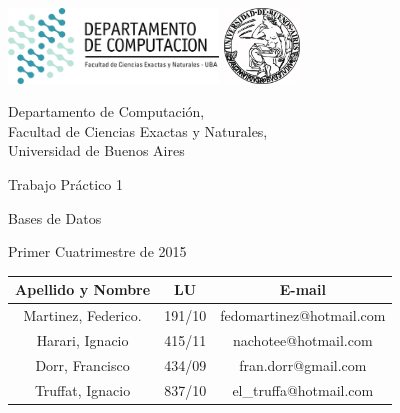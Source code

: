 \documentclass[a4paper, 10pt, twoside]{article}
\newcommand{\titulo}{Trabajo Práctico 1}
\newcommand{\materia}{Bases de Datos}
\newcommand{\cuatrimestre}{Primer Cuatrimestre de 2015}
\begin{document}


\thispagestyle{caratula}

\begin{center}

\includegraphics[height=2cm]{DC.png} 
\hfill
\includegraphics[height=2cm]{UBA.jpg} 

\vspace{2cm}

Departamento de Computación,\\
Facultad de Ciencias Exactas y Naturales,\\
Universidad de Buenos Aires

\vspace{4cm}

\begin{Huge}
\titulo
\end{Huge}

\vspace{0.5cm}

\begin{Large}
\materia
\end{Large}

\vspace{1cm}

\cuatrimestre

\vspace{4cm}

\begin{tabular}{|c|c|c|}
\hline
Apellido y Nombre & LU & E-mail\\
\hline
Martinez, Federico.  & 191/10 &  fedomartinez@hotmail.com\\
Harari, Ignacio      & 415/11 & nachotee@hotmail.com\\
Dorr, Francisco & 434/09 & fran.dorr@gmail.com\\
Truffat, Ignacio & 837/10 & el\_truffa@hotmail.com\\
\hline
\end{tabular}

\end{center}
\end{document}
